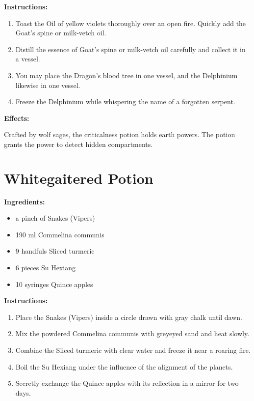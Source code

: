 \documentclass{article}
\begin{document}
\textbf{Instructions:}

\begin{enumerate}
  \item Toast the Oil of yellow violets thoroughly over an open fire. Quickly add the Goat's spine or milk-vetch oil.
  \item Distill the essence of Goat's spine or milk-vetch oil carefully and collect it in a vessel.
  \item You may place the Dragon's blood tree in one vessel, and the Delphinium likewise in one vessel.
  \item Freeze the Delphinium while whispering the name of a forgotten serpent.
\end{enumerate}

\textbf{Effects:}

Crafted by wolf sages, the criticalness potion holds earth powers. The potion grants the power to detect hidden compartments.

\newpage
\section*{Whitegaitered Potion}

\textbf{Ingredients:}

\begin{itemize}
  \item a pinch of Snakes (Vipers)
  \item 190 ml Commelina communis
  \item 9 handfuls Sliced ​​turmeric
  \item 6 pieces Su Hexiang
  \item 10 syringes Quince apples
\end{itemize}

\textbf{Instructions:}

\begin{enumerate}
  \item Place the Snakes (Vipers) inside a circle drawn with gray chalk until dawn.
  \item Mix the powdered Commelina communis with greyeyed sand and heat slowly.
  \item Combine the Sliced ​​turmeric with clear water and freeze it near a roaring fire.
  \item Boil the Su Hexiang under the influence of the alignment of the planets.
  \item Secretly exchange the Quince apples with its reflection in a mirror for two days.
\end{enumerate}
\end{document}
